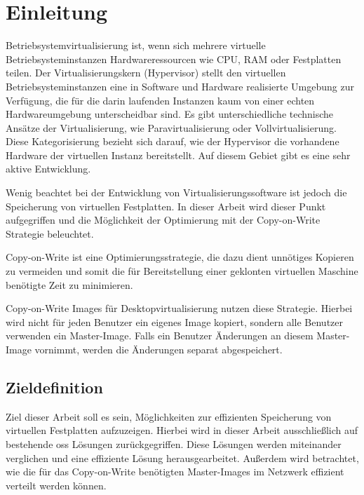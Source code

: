 \chapter{Einleitung}

Betriebsystemvirtualisierung ist, wenn sich mehrere virtuelle Betriebsysteminstanzen Hardwareressourcen wie CPU, RAM oder Festplatten teilen. Der Virtualisierungskern (Hypervisor) stellt den virtuellen Betriebsysteminstanzen eine in Software und Hardware realisierte Umgebung zur Verfügung, die für die darin laufenden Instanzen kaum von einer echten Hardwareumgebung unterscheidbar sind. Es gibt unterschiedliche technische Ansätze der Virtualisierung, wie Paravirtualisierung oder Vollvirtualisierung. Diese Kategorisierung bezieht sich darauf, wie der Hypervisor die vorhandene Hardware der virtuellen Instanz bereitstellt. Auf diesem Gebiet gibt es eine sehr aktive Entwicklung. \cite{andrep} \cite{baun}

Wenig beachtet bei der Entwicklung von Virtualisierungssoftware ist jedoch die Speicherung von virtuellen Festplatten. In dieser Arbeit wird dieser Punkt aufgegriffen und die Möglichkeit der Optimierung mit der Copy-on-Write Strategie beleuchtet.

Copy-on-Write ist eine Optimierungsstrategie, die dazu dient unnötiges Kopieren zu vermeiden und somit die für Bereitstellung einer geklonten virtuellen Maschine benötigte Zeit zu minimieren.\begin{comment} Zusätzlich werden die Systemressourcen (Storage, IO, CPU) des physikalischen Virtualisierungsservers geschont. \end{comment} Copy-on-Write Images für Desktopvirtualisierung nutzen diese Strategie. Hierbei wird nicht für jeden Benutzer ein eigenes Image kopiert, sondern alle Benutzer verwenden ein Master-Image. Falls ein Benutzer Änderungen an diesem Master-Image vornimmt, werden die Änderungen separat abgespeichert. 

\section{Zieldefinition}
Ziel dieser Arbeit soll es sein, Möglichkeiten zur effizienten Speicherung von virtuellen Festplatten aufzuzeigen. Hierbei wird in dieser Arbeit ausschließlich auf bestehende \gls{oss} Lösungen zurückgegriffen. Diese Lösungen werden miteinander verglichen und eine effiziente Lösung herausgearbeitet. Außerdem wird betrachtet, wie die für das Copy-on-Write benötigten Master-Images im Netzwerk effizient verteilt werden können. 

